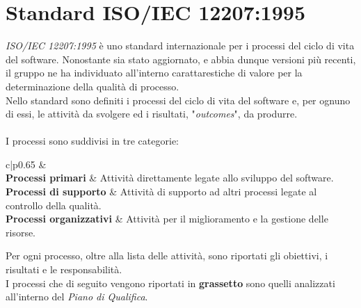 \section{Standard ISO/IEC 12207:1995}
\textit{ISO/IEC 12207:1995} è uno standard 
internazionale per i processi del ciclo di vita del software.
Nonostante sia stato aggiornato, e abbia dunque versioni più recenti, il gruppo
ne ha individuato all'interno carattarestiche di valore per la determinazione
della qualità di processo.\\
\noindent
Nello standard sono definiti i processi del ciclo di vita del 
software e, per ognuno di essi, le attività da svolgere ed i
risultati, "\textit{outcomes}", da produrre.\\ \\
\noindent 
I processi sono suddivisi in tre categorie:

\setlength\extrarowheight{5pt}

\begin{table}[h!]
    \centering
    \begin{tabular}{c|p{0.65\linewidth}}
        &  \\[4pt]
	    	\textbf{Processi primari} & Attività direttamente legate allo sviluppo del software. \\[4pt]
	    	\textbf{Processi di supporto} & Attività di supporto ad altri processi legate al controllo della qualità. \\[4pt]
	    	\textbf{Processi organizzativi} & Attività per il miglioramento e la gestione delle risorse.\\[4pt]
    \end{tabular}
    \caption{Categorie di processo}
\end{table}

\noindent
Per ogni processo, oltre alla lista delle attività, sono riportati
gli obiettivi, i risultati e le responsabilità.\\
I processi che di seguito vengono riportati in \textbf{grassetto} sono quelli analizzati all'interno
del \textit{Piano di Qualifica}.



